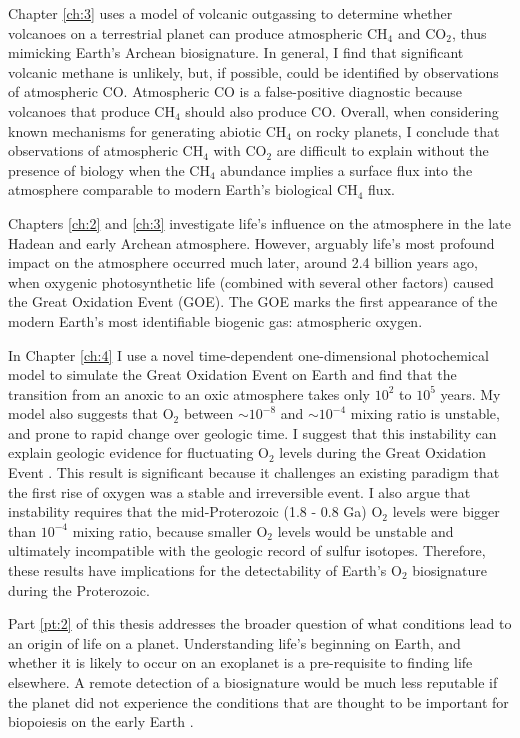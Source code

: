 Chapter \ref{ch:3} uses a model of volcanic outgassing to determine whether volcanoes on a terrestrial planet can produce atmospheric CH$_4$ and CO$_2$, thus mimicking Earth's Archean biosignature. In general, I find that significant volcanic methane is unlikely, but, if possible, could be identified by observations of atmospheric CO. Atmospheric CO is a false-positive diagnostic because volcanoes that produce CH$_4$ should also produce CO. Overall, when considering known mechanisms for generating abiotic CH$_4$ on rocky planets, I conclude that observations of atmospheric CH$_4$ with CO$_2$ are difficult to explain without the presence of biology when the CH$_4$ abundance implies a surface flux into the atmosphere comparable to modern Earth's biological CH$_4$ flux.

Chapters \ref{ch:2} and \ref{ch:3} investigate life's influence on the atmosphere in the late Hadean and early Archean atmosphere. However, arguably life's most profound impact on the atmosphere occurred much later, around 2.4 billion years ago, when oxygenic photosynthetic life (combined with several other factors) caused the Great Oxidation Event (GOE). The GOE marks the first appearance of the modern Earth's most identifiable biogenic gas: atmospheric oxygen.

In Chapter \ref{ch:4} I use a novel time-dependent one-dimensional photochemical model to simulate the Great Oxidation Event on Earth and find that the transition from an anoxic to an oxic atmosphere takes only $10^2$ to $10^5$ years. My model also suggests that O$_2$ between $\sim 10^{-8}$ and $\sim 10^{-4}$ mixing ratio is unstable, and prone to rapid change over geologic time. I suggest that this instability can explain geologic evidence for fluctuating O$_2$ levels during the Great Oxidation Event \citep{Poulton_2021}. This result is significant because it challenges an existing paradigm \citep{Goldblatt_2006} that the first rise of oxygen was a stable and irreversible event. I also argue that instability requires that the mid-Proterozoic (1.8 - 0.8 Ga) O$_2$ levels were bigger than $10^{-4}$ mixing ratio, because smaller O$_2$ levels would be unstable and ultimately incompatible with the geologic record of sulfur isotopes. Therefore, these results have implications for the detectability of Earth's O$_2$ biosignature during the Proterozoic.

Part \ref{pt:2} of this thesis addresses the broader question of what conditions lead to an origin of life on a planet. Understanding life's beginning on Earth, and whether it is likely to occur on an exoplanet is a pre-requisite to finding life elsewhere. A remote detection of a biosignature would be much less reputable if the planet did not experience the conditions that are thought to be important for biopoiesis on the early Earth \citep{Catling_2018}.

